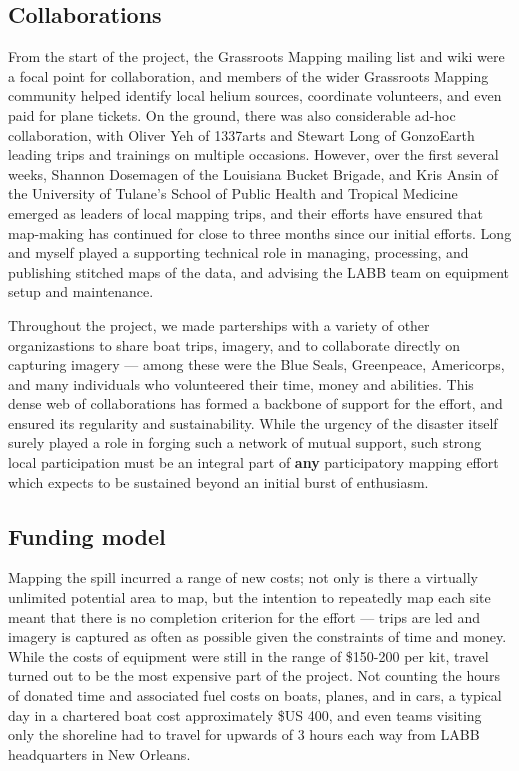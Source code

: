 \documentclass[11pt,oneside,notitlepage]{report}
\begin{document}
\subsection{Collaborations}

From the start of the project, the Grassroots Mapping mailing list and wiki were a focal point for collaboration, and members of the wider Grassroots Mapping community helped identify local helium sources, coordinate volunteers, and even paid for plane tickets. On the ground, there was also considerable ad-hoc collaboration, with Oliver Yeh of 1337arts and Stewart Long of GonzoEarth leading trips and trainings on multiple occasions. However, over the first several weeks, Shannon Dosemagen of the Louisiana Bucket Brigade, and Kris Ansin of the University of Tulane's School of Public Health and Tropical Medicine emerged as leaders of local mapping trips, and their efforts have ensured that map-making has continued for close to three months since our initial efforts. Long and myself played a supporting technical role in managing, processing, and publishing stitched maps of the data, and advising the LABB team on equipment setup and maintenance. 

Throughout the project, we made parterships with a variety of other organizastions to share boat trips, imagery, and to collaborate directly on capturing imagery --- among these were the Blue Seals, Greenpeace, Americorps, and many individuals who volunteered their time, money and abilities. This dense web of collaborations has formed a backbone of support for the effort, and ensured its regularity and sustainability. While the urgency of the disaster itself surely played a role in forging such a network of mutual support, such strong local participation must be an integral part of \textbf{any} participatory mapping effort which expects to be sustained beyond an initial burst of enthusiasm.

\subsection{Funding model}

Mapping the spill incurred a range of new costs; not only is there a virtually unlimited potential area to map, but the intention to repeatedly map each site meant that there is no completion criterion for the effort --- trips are led and imagery is captured as often as possible given the constraints of time and money. While the costs of equipment were still in the range of \$150-200 per kit, travel turned out to be the most expensive part of the project. Not counting the hours of donated time and associated fuel costs on boats, planes, and in cars, a typical day in a chartered boat cost approximately \$US 400, and even teams visiting only the shoreline had to travel for upwards of 3 hours each way from \ac{LABB} headquarters in New Orleans. 
\end{document}
